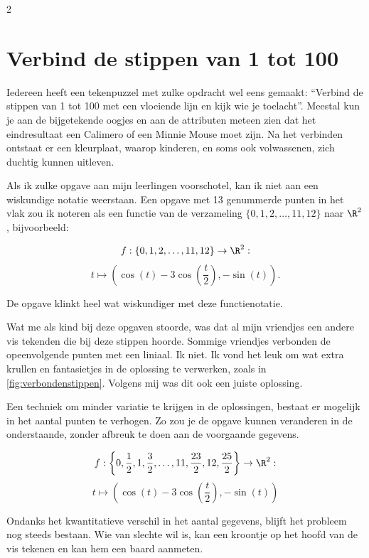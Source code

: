 \begin{multicols}{2}
	\section{Verbind de stippen van 1 tot 100}
	
Iedereen heeft een tekenpuzzel met zulke opdracht wel eens gemaakt: ``Verbind de stippen van 1 tot 100 met een vloeiende lijn en kijk wie je toelacht''. Meestal kun je aan de bijgetekende oogjes en aan de attributen meteen zien dat het eindresultaat een Calimero of een Minnie Mouse moet zijn. Na het verbinden ontstaat er een kleurplaat, waarop kinderen, en soms ook volwassenen, zich duchtig kunnen uitleven.

Als ik zulke opgave aan mijn leerlingen voorschotel, kan ik niet aan een wiskundige notatie weerstaan. Een opgave met 13 genummerde punten in het vlak zou ik noteren als een functie van de verzameling $\{0, 1, 2, \dots, 11, 12 \}$ naar $\R^2$, bijvoorbeeld:

\[f: \{0, 1, 2, \dots, 11, 12 \} \to  \R^2: \]
\[t \mapsto \left(\cos(t)-3 \cos \left(\frac{t}{2} \right),-\sin(t) \right).\]

De opgave klinkt heel wat wiskundiger met deze functienotatie.


Wat me als kind bij deze opgaven stoorde, was dat al mijn vriendjes een andere vis tekenden die bij deze stippen hoorde. Sommige vriendjes verbonden de opeenvolgende punten met een liniaal. Ik niet. Ik vond het leuk om wat extra krullen en fantasietjes in de oplossing te verwerken, zoals in \autoref{fig:verbondenstippen}. Volgens mij was dit ook een juiste oplossing. 


Een techniek om minder variatie te krijgen in de oplossingen, bestaat er mogelijk in het aantal punten te verhogen. Zo zou je de opgave kunnen veranderen in de onderstaande, zonder afbreuk te doen aan de voorgaande gegevens.

\[f: \left\{ 0, \frac{1}{2}, 1, \frac{3}{2}, \dots, 11,  \frac{23}{2}, 12, \frac{25}{2}  \right\} \to  \R^2: \]
\[t \mapsto \left(\cos(t)-3 \cos \left(\frac{t}{2} \right),-\sin(t) \right)\]


Ondanks het kwantitatieve verschil in het aantal gegevens, blijft het probleem nog steeds bestaan. Wie van slechte wil is, kan een kroontje op het hoofd van de vis tekenen en kan hem een baard aanmeten. 


\end{multicols}
